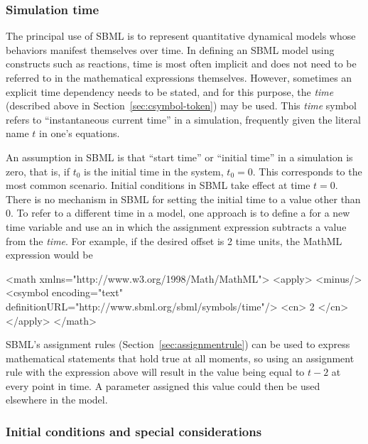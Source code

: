 \subsubsection{Simulation time}
\label{sec:meaning-of-time}

The principal use of SBML is to represent quantitative dynamical
models whose behaviors manifest themselves over time.  In defining
an SBML model using constructs such as reactions, time is most
often implicit and does not need to be referred to in the
mathematical expressions themselves.  However, sometimes an
explicit time dependency needs to be stated, and for this purpose,
the \emph{time}  (described above in
Section~\ref{sec:csymbol-token}) may be used.  This \emph{time}
symbol refers to ``instantaneous current time'' in a simulation,
frequently given the literal name $t$ in one's equations.

An assumption in SBML is that ``start time'' or ``initial time''
in a simulation is zero, that is, if $t_0$ is the initial time in
the system, $t_0 = 0$.  This corresponds to the most common
scenario.  Initial conditions in SBML take effect at time $t = 0$.
There is no mechanism in SBML for setting the initial time to a
value other than 0.  To refer to a different time in a model, one
approach is to define a \Parameter for a new time variable and use
an \AssignmentRule in which the assignment expression subtracts a
value from the  \emph{time}.  For example, if the
desired offset is 2 time units, the MathML expression would be

\begin{example}
<math xmlns="http://www.w3.org/1998/Math/MathML">
    <apply>
        <minus/>
        <csymbol encoding="text" definitionURL="http://www.sbml.org/sbml/symbols/time"/> 
        <cn> 2 </cn>
    </apply>
</math>
\end{example}

SBML's assignment rules (Section~\ref{sec:assignmentrule}) can be
used to express mathematical statements that hold true at all
moments, so using an assignment rule with the expression above
will result in the value being equal to $t - 2$ at every point in
time.  A parameter assigned this value could then be used
elsewhere in the model.


\subsubsection{Initial conditions and special considerations}
\label{sec:before-t0}

